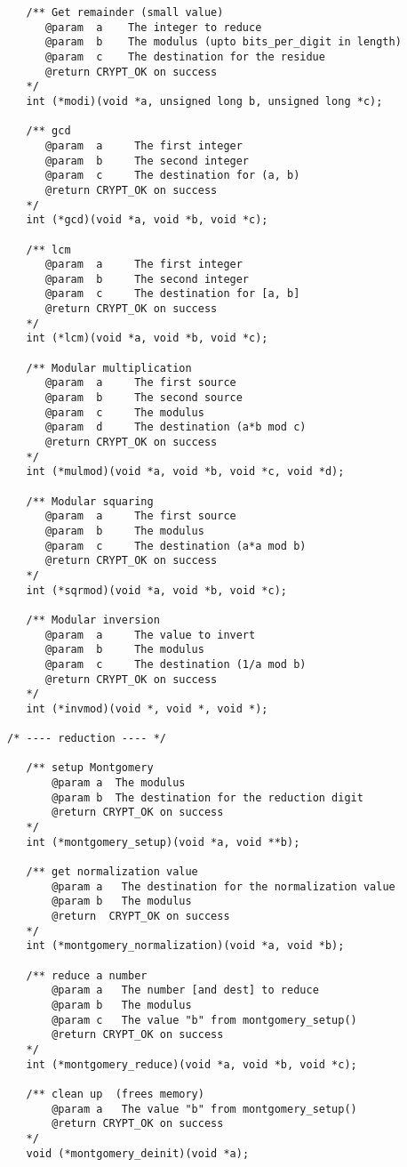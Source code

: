 \documentclass[synpaper]{book}
\begin{document}
\begin{small}
\begin{verbatim}
   /** Get remainder (small value)
      @param  a    The integer to reduce
      @param  b    The modulus (upto bits_per_digit in length)
      @param  c    The destination for the residue
      @return CRYPT_OK on success
   */
   int (*modi)(void *a, unsigned long b, unsigned long *c);

   /** gcd
      @param  a     The first integer
      @param  b     The second integer
      @param  c     The destination for (a, b)
      @return CRYPT_OK on success
   */
   int (*gcd)(void *a, void *b, void *c);

   /** lcm
      @param  a     The first integer
      @param  b     The second integer
      @param  c     The destination for [a, b]
      @return CRYPT_OK on success
   */
   int (*lcm)(void *a, void *b, void *c);

   /** Modular multiplication
      @param  a     The first source
      @param  b     The second source
      @param  c     The modulus
      @param  d     The destination (a*b mod c)
      @return CRYPT_OK on success
   */
   int (*mulmod)(void *a, void *b, void *c, void *d);

   /** Modular squaring
      @param  a     The first source
      @param  b     The modulus
      @param  c     The destination (a*a mod b)
      @return CRYPT_OK on success
   */
   int (*sqrmod)(void *a, void *b, void *c);

   /** Modular inversion
      @param  a     The value to invert
      @param  b     The modulus
      @param  c     The destination (1/a mod b)
      @return CRYPT_OK on success
   */
   int (*invmod)(void *, void *, void *);

/* ---- reduction ---- */

   /** setup Montgomery
       @param a  The modulus
       @param b  The destination for the reduction digit
       @return CRYPT_OK on success
   */
   int (*montgomery_setup)(void *a, void **b);

   /** get normalization value
       @param a   The destination for the normalization value
       @param b   The modulus
       @return  CRYPT_OK on success
   */
   int (*montgomery_normalization)(void *a, void *b);

   /** reduce a number
       @param a   The number [and dest] to reduce
       @param b   The modulus
       @param c   The value "b" from montgomery_setup()
       @return CRYPT_OK on success
   */
   int (*montgomery_reduce)(void *a, void *b, void *c);

   /** clean up  (frees memory)
       @param a   The value "b" from montgomery_setup()
       @return CRYPT_OK on success
   */
   void (*montgomery_deinit)(void *a);


\end{verbatim}
\end{small}
\end{document}
